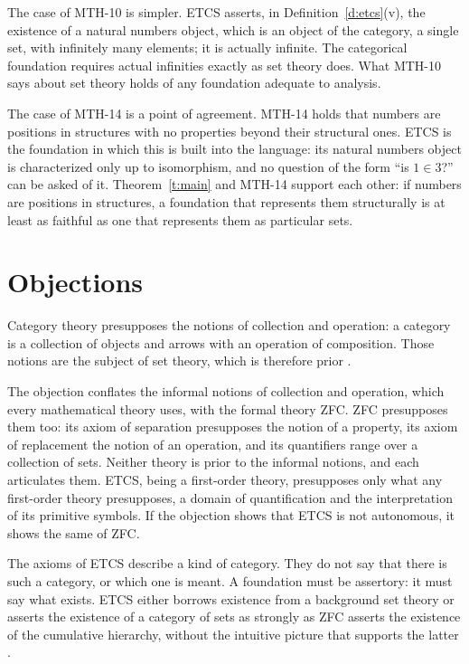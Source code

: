 \documentclass{situationist-preprint}
\begin{document}
The case of MTH-10 is simpler. ETCS asserts, in Definition~\ref{d:etcs}(v), the existence of a natural numbers object, which is an object of the category, a single set, with infinitely many elements; it is actually infinite. The categorical foundation requires actual infinities exactly as set theory does. What MTH-10 says about set theory holds of any foundation adequate to analysis.

The case of MTH-14 is a point of agreement. MTH-14 holds that numbers are positions in structures with no properties beyond their structural ones. ETCS is the foundation in which this is built into the language: its natural numbers object is characterized only up to isomorphism, and no question of the form \enquote{is $1 \in 3$?} can be asked of it. Theorem~\ref{t:main} and MTH-14 support each other: if numbers are positions in structures, a foundation that represents them structurally is at least as faithful as one that represents them as particular sets.

\section{Objections}\label{s:objections}

\begin{objection}
Category theory presupposes the notions of collection and operation: a category is a collection of objects and arrows with an operation of composition. Those notions are the subject of set theory, which is therefore prior \citep{Feferman1977}.
\end{objection}

\begin{reply}
The objection conflates the informal notions of collection and operation, which every mathematical theory uses, with the formal theory ZFC. ZFC presupposes them too: its axiom of separation presupposes the notion of a property, its axiom of replacement the notion of an operation, and its quantifiers range over a collection of sets. Neither theory is prior to the informal notions, and each articulates them. ETCS, being a first-order theory, presupposes only what any first-order theory presupposes, a domain of quantification and the interpretation of its primitive symbols. If the objection shows that ETCS is not autonomous, it shows the same of ZFC.
\end{reply}

\begin{objection}
The axioms of ETCS describe a kind of category. They do not say that there is such a category, or which one is meant. A foundation must be assertory: it must say what exists. ETCS either borrows existence from a background set theory or asserts the existence of a category of sets as strongly as ZFC asserts the existence of the cumulative hierarchy, without the intuitive picture that supports the latter \citep{Hellman2003}.
\end{objection}
\end{document}
